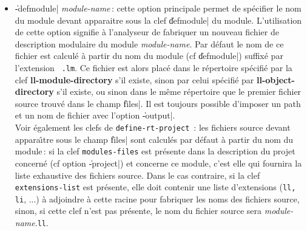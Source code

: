 \begin{itemize}
\item {\Large \|-defmodule| {\em module-name}}\,: cette option principale
permet de 
sp\'{e}cifier le nom du module devant apparaitre sous la clef \|defmodule| du
module. L'utilisation de cette option signifie \`{a} l'analyseur de
fabriquer un nouveau fichier de description modulaire du module {\em
module-name}.
Par d\'{e}faut le nom de ce fichier est calcul\'{e} \`{a}
partir du nom du module (cf \|defmodule|) suffix\'{e} par l'extension {\tt
.lm}. Ce fichier est alors plac\'{e} dans le r\'{e}pertoire sp\'{e}cifi\'{e} par
la clef {\bf ll-module-directory} s'il existe, sinon par celui
sp\'{e}cifi\'{e} par {\bf ll-object-directory} s'il existe, ou sinon dans
le m\^{e}me r\'{e}pertoire que le premier fichier source trouv\'{e} dans le champ
\|files|. Il est toujours possible d'imposer un path et un nom de
fichier avec l'option \|-output|. \\
Voir \'{e}galement les clefs de {\tt define-rt-project}\ : 
les fichiers source devant appara\^{\i}tre sous le champ \|files| sont
calcul\'{e}s par d\'{e}faut \`{a} partir du nom du module\,: 
si la clef {\tt modules-files} est pr\'{e}sente dans 
la description du projet concern\'{e} (cf option \|-project|) et
concerne ce module, c'est elle qui fournira la liste exhaustive
des fichiers source. Dans le cas contraire, 
si la clef {\tt extensions-list} est
pr\'{e}sente, elle doit
contenir une liste d'extensions ({\tt ll, li}, ...) \`{a} adjoindre \`{a}
cette racine pour fabriquer les noms des fichiers source, sinon, si
cette clef n'est pas pr\'{e}sente, le
nom du fichier source sera {\em module-name}.{\tt ll}.


\end{itemize}
